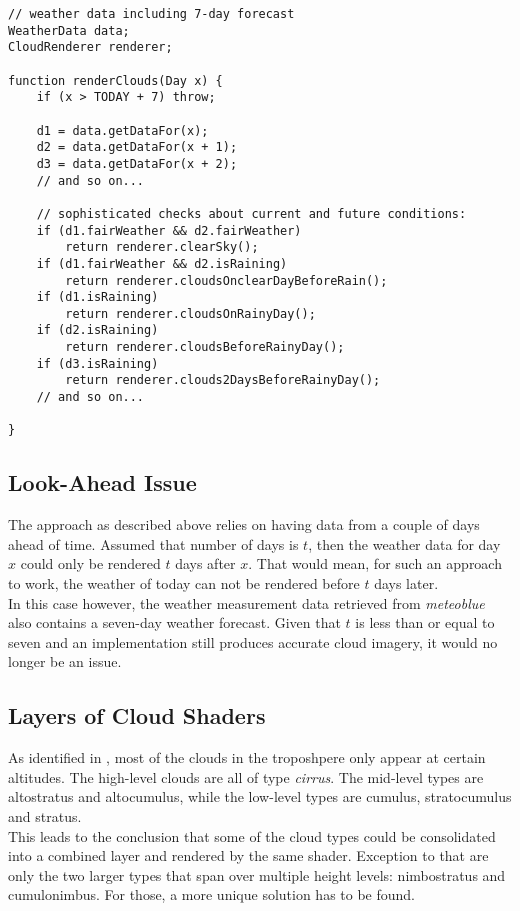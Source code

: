 \begin{lstlisting}[language=HLSL, caption=Pseudo-code of cloud render algorithm., label=lst:pseudo:algorithm]
// weather data including 7-day forecast
WeatherData data;
CloudRenderer renderer;

function renderClouds(Day x) {
    if (x > TODAY + 7) throw;

    d1 = data.getDataFor(x);
    d2 = data.getDataFor(x + 1);
    d3 = data.getDataFor(x + 2);
    // and so on...

    // sophisticated checks about current and future conditions:
    if (d1.fairWeather && d2.fairWeather)
        return renderer.clearSky();
    if (d1.fairWeather && d2.isRaining)
        return renderer.cloudsOnclearDayBeforeRain();
    if (d1.isRaining)
        return renderer.cloudsOnRainyDay();
    if (d2.isRaining) 
        return renderer.cloudsBeforeRainyDay();
    if (d3.isRaining) 
        return renderer.clouds2DaysBeforeRainyDay();
    // and so on...
    
}
\end{lstlisting}

\clearpage

\subsection{Look-Ahead Issue}
The approach as described above relies on having data from a couple of days ahead of time. Assumed that number of days is $t$, then the weather data for day $x$ could only be rendered $t$ days after $x$.
That would mean, for such an approach to work, the weather of today can not be rendered before $t$ days later.
\\
In this case however, the weather measurement data retrieved from \emph{meteoblue} also contains a seven-day weather forecast. 
Given that $t$ is less than or equal to seven and an implementation still produces accurate cloud imagery, it would no longer be an issue.

\subsection{Layers of Cloud Shaders}
\label{section:impl:layers}
As identified in , most of the clouds in the troposhpere only appear at certain \gls{altitude}s.
The high-level clouds are all of type \emph{cirrus}.
The mid-level types are altostratus and altocumulus, while the low-level types are cumulus, stratocumulus and stratus.
\\
This leads to the conclusion that some of the cloud types could be consolidated into a combined layer and rendered by the same shader.
Exception to that are only the two larger types that span over multiple height levels: nimbostratus and cumulonimbus. For those, a more unique solution has to be found.

